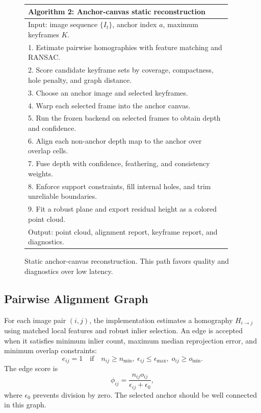 \documentclass[conference]{IEEEtran}
\begin{document}
\begin{figure}[t]
\centering
\footnotesize
\begin{tabular}{p{0.94\linewidth}}
\toprule
\textbf{Algorithm 2: Anchor-canvas static reconstruction}\\
\midrule
Input: image sequence $\{I_t\}$, anchor index $a$, maximum keyframes $K$.\\
1. Estimate pairwise homographies with feature matching and RANSAC.\\
2. Score candidate keyframe sets by coverage, compactness, hole penalty, and graph distance.\\
3. Choose an anchor image and selected keyframes.\\
4. Warp each selected frame into the anchor canvas.\\
5. Run the frozen backend on selected frames to obtain depth and confidence.\\
6. Align each non-anchor depth map to the anchor over overlap cells.\\
7. Fuse depth with confidence, feathering, and consistency weights.\\
8. Enforce support constraints, fill internal holes, and trim unreliable boundaries.\\
9. Fit a robust plane and export residual height as a colored point cloud.\\
Output: point cloud, alignment report, keyframe report, and diagnostics.\\
\bottomrule
\end{tabular}
\caption{Static anchor-canvas reconstruction. This path favors quality and diagnostics over low latency.}
\label{fig:alg_anchor}
\end{figure}

\subsection{Pairwise Alignment Graph}
For each image pair $(i,j)$, the implementation estimates a homography $H_{i \rightarrow j}$ using matched local features and robust inlier selection. An edge is accepted when it satisfies minimum inlier count, maximum median reprojection error, and minimum overlap constraints:
\begin{equation}
e_{ij}=1\quad \mathrm{if}\quad n_{ij}\ge n_{\min},\; \epsilon_{ij}\le \epsilon_{\max},\; o_{ij}\ge o_{\min}.
\end{equation}
The edge score is
\begin{equation}
\phi_{ij}=\frac{n_{ij}o_{ij}}{\epsilon_{ij}+\epsilon_0},
\end{equation}
where $\epsilon_0$ prevents division by zero. The selected anchor should be well connected in this graph.
\end{document}
